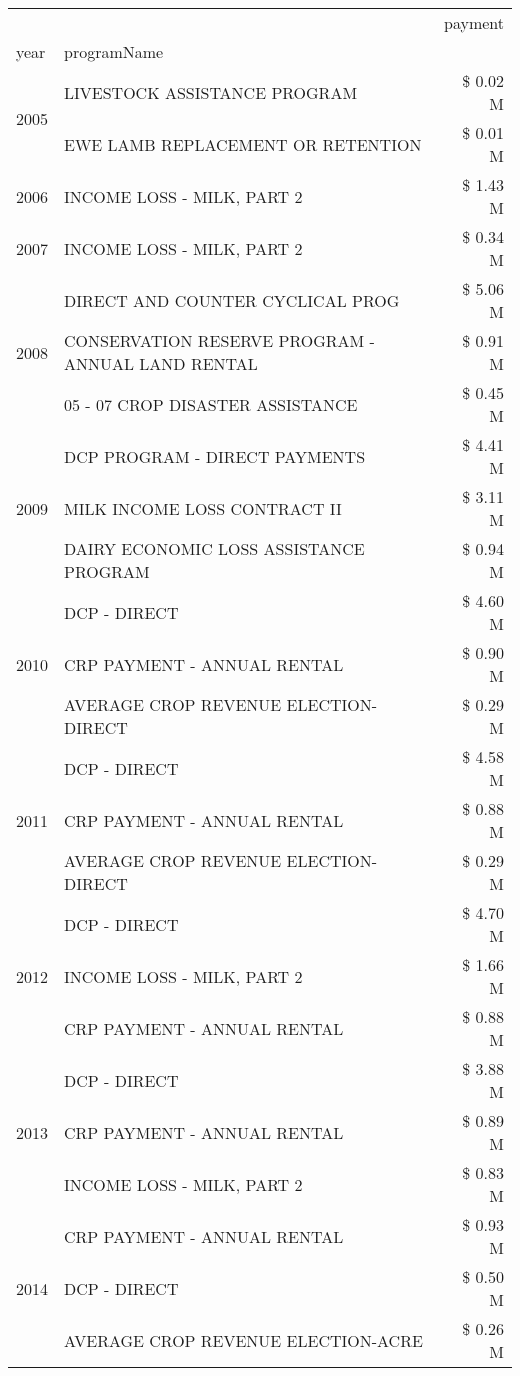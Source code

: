 \begin{tabular}{llr}
\toprule
 &  & payment \\
year & programName &  \\
\midrule
\multirow[t]{2}{*}{2005} & LIVESTOCK ASSISTANCE PROGRAM & \$ 0.02 M \\
 & EWE LAMB REPLACEMENT OR RETENTION & \$ 0.01 M \\
\cline{1-3}
2006 & INCOME LOSS - MILK, PART 2 & \$ 1.43 M \\
\cline{1-3}
2007 & INCOME LOSS - MILK, PART 2 & \$ 0.34 M \\
\cline{1-3}
\multirow[t]{3}{*}{2008} & DIRECT AND COUNTER CYCLICAL PROG & \$ 5.06 M \\
 & CONSERVATION RESERVE PROGRAM - ANNUAL LAND RENTAL & \$ 0.91 M \\
 & 05 - 07 CROP DISASTER ASSISTANCE & \$ 0.45 M \\
\cline{1-3}
\multirow[t]{3}{*}{2009} & DCP PROGRAM - DIRECT PAYMENTS & \$ 4.41 M \\
 & MILK INCOME LOSS CONTRACT II & \$ 3.11 M \\
 & DAIRY ECONOMIC LOSS ASSISTANCE PROGRAM & \$ 0.94 M \\
\cline{1-3}
\multirow[t]{3}{*}{2010} & DCP - DIRECT & \$ 4.60 M \\
 & CRP PAYMENT - ANNUAL RENTAL & \$ 0.90 M \\
 & AVERAGE CROP REVENUE ELECTION-DIRECT & \$ 0.29 M \\
\cline{1-3}
\multirow[t]{3}{*}{2011} & DCP - DIRECT & \$ 4.58 M \\
 & CRP PAYMENT - ANNUAL RENTAL & \$ 0.88 M \\
 & AVERAGE CROP REVENUE ELECTION-DIRECT & \$ 0.29 M \\
\cline{1-3}
\multirow[t]{3}{*}{2012} & DCP - DIRECT & \$ 4.70 M \\
 & INCOME LOSS - MILK, PART 2 & \$ 1.66 M \\
 & CRP PAYMENT - ANNUAL RENTAL & \$ 0.88 M \\
\cline{1-3}
\multirow[t]{3}{*}{2013} & DCP - DIRECT & \$ 3.88 M \\
 & CRP PAYMENT - ANNUAL RENTAL & \$ 0.89 M \\
 & INCOME LOSS - MILK, PART 2 & \$ 0.83 M \\
\cline{1-3}
\multirow[t]{3}{*}{2014} & CRP PAYMENT - ANNUAL RENTAL & \$ 0.93 M \\
 & DCP - DIRECT & \$ 0.50 M \\
 & AVERAGE CROP REVENUE ELECTION-ACRE & \$ 0.26 M \\

\end{tabular}
